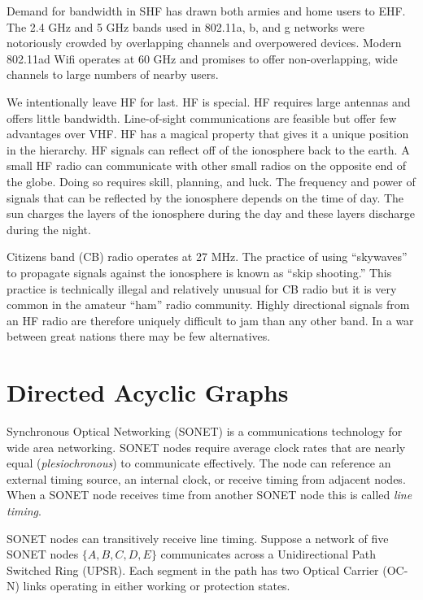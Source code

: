 \documentclass{book}
\begin{document}
Demand for bandwidth in SHF has drawn both armies and home users to EHF. The 2.4 \si{\GHz} and 5 \si{\GHz} bands used in 802.11a, b, and g networks were notoriously crowded by overlapping channels and overpowered devices. Modern 802.11ad Wifi operates at 60 \si{\GHz} and promises to offer non-overlapping, wide channels to large numbers of nearby users.

We intentionally leave HF for last. HF is special. HF requires large antennas and offers little bandwidth. Line-of-sight communications are feasible but offer few advantages over VHF. HF has a magical property that gives it a unique position in the hierarchy. HF signals can reflect off of the ionosphere back to the earth. A small HF radio can communicate with other small radios on the opposite end of the globe. Doing so requires skill, planning, and luck. The frequency and power of signals that can be reflected by the ionosphere depends on the time of day. The sun charges the layers of the ionosphere during the day and these layers discharge during the night.

Citizens band (CB) radio operates at 27 \si{\MHz}. The practice of using ``skywaves'' to propagate signals against the ionosphere is known as ``skip shooting.'' This practice is technically illegal and relatively unusual for CB radio but it is very common in the amateur ``ham'' radio community. Highly directional signals from an HF radio are therefore uniquely difficult to jam than any other band. In a war between great nations there may be few alternatives.

\chapter{Directed Acyclic Graphs}

Synchronous Optical Networking (SONET) is a communications technology for wide area networking. SONET nodes require average clock rates that are nearly equal (\textit{plesiochronous}) to communicate effectively. The node can reference an external timing source, an internal clock, or receive timing from adjacent nodes. When a SONET node receives time from another SONET node this is called \textit{line timing}.

SONET nodes can transitively receive line timing. Suppose a network of five SONET nodes $\{A, B, C, D, E\}$ communicates across a Unidirectional Path Switched Ring (UPSR). Each segment in the path has two Optical Carrier (OC-N) links operating in either working or protection states.
\end{document}
